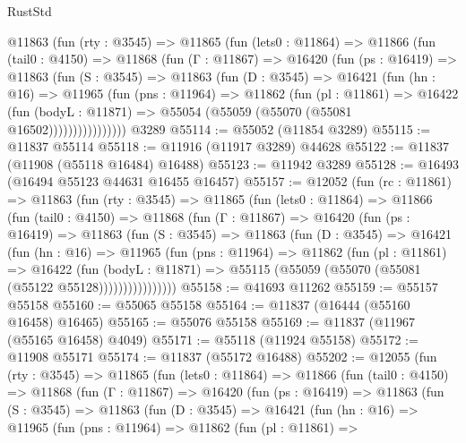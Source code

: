 \begin{lexlean}{RustStd}
\begin{coremodule}
      @11863
        (fun (rty : @3545) =>
        @11865
          (fun (lets0 : @11864) =>
          @11866
            (fun (tail0 : @4150) =>
            @11868
              (fun (Γ : @11867) =>
              @16420
                (fun (ps : @16419) =>
                @11863
                  (fun (S : @3545) =>
                  @11863
                    (fun (D : @3545) =>
                    @16421
                      (fun (hn : @16) =>
                      @11965
                        (fun (pns : @11964) =>
                        @11862
                          (fun (pl : @11861) =>
                          @16422
                            (fun (bodyL : @11871) =>
                            @55054 (@55059 (@55070 (@55081 @16502))))))))))))))))
    @3289
@55114 := @55052 (@11854 @3289)
@55115 := @11837 @55114
@55118 := @11916 (@11917 @3289) @44628
@55122 := @11837 (@11908 (@55118 @16484) @16488)
@55123 := @11942 @3289
@55128 := @16493 (@16494 @55123 @44631 @16455 @16457)
@55157 := @12052
    (fun (rc : @11861) =>
    @11863
      (fun (rty : @3545) =>
      @11865
        (fun (lets0 : @11864) =>
        @11866
          (fun (tail0 : @4150) =>
          @11868
            (fun (Γ : @11867) =>
            @16420
              (fun (ps : @16419) =>
              @11863
                (fun (S : @3545) =>
                @11863
                  (fun (D : @3545) =>
                  @16421
                    (fun (hn : @16) =>
                    @11965
                      (fun (pns : @11964) =>
                      @11862
                        (fun (pl : @11861) =>
                        @16422
                          (fun (bodyL : @11871) =>
                          @55115 (@55059 (@55070 (@55081 (@55122 @55128))))))))))))))))
@55158 := @41693 @11262
@55159 := @55157 @55158
@55160 := @55065 @55158
@55164 := @11837 (@16444 (@55160 @16458) @16465)
@55165 := @55076 @55158
@55169 := @11837 (@11967 (@55165 @16458) @4049)
@55171 := @55118 (@11924 @55158)
@55172 := @11908 @55171
@55174 := @11837 (@55172 @16488)
@55202 := @12055
    (fun (rty : @3545) =>
    @11865
      (fun (lets0 : @11864) =>
      @11866
        (fun (tail0 : @4150) =>
        @11868
          (fun (Γ : @11867) =>
          @16420
            (fun (ps : @16419) =>
            @11863
              (fun (S : @3545) =>
              @11863
                (fun (D : @3545) =>
                @16421
                  (fun (hn : @16) =>
                  @11965
                    (fun (pns : @11964) =>
                    @11862
                      (fun (pl : @11861) =>

\end{coremodule}
\end{lexlean}
